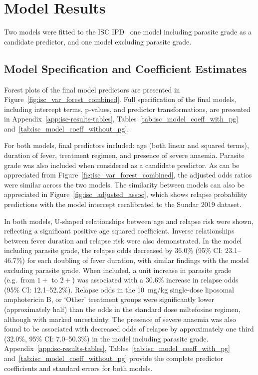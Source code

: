 \section{Model Results}

Two models were fitted to the ISC IPD \textemdash\ one model including parasite grade as a candidate predictor, and one model excluding parasite grade.

\subsection{Model Specification and Coefficient Estimates}

Forest plots of the final model predictors are presented in Figure~\ref{fig:isc_var_forest_combined}. Full specification of the final models, including intercept terms, p-values, and predictor transformations, are presented in Appendix~\ref{app:isc-results-tables}, Tables~\ref{tab:isc_model_coeff_with_pg} and~\ref{tab:isc_model_coeff_without_pg}.

For both models, final predictors included: age (both linear and squared terms), duration of fever, treatment regimen, and presence of severe anaemia. Parasite grade was also included when considered as a candidate predictor. As can be appreciated from Figure~\ref{fig:isc_var_forest_combined}, the adjusted odds ratios were similar across the two models. The similarity between models can also be appreciated in Figure~\ref{fig:isc_adjusted_assoc}, which shows relapse probability predictions with the model intercept recalibrated to the Sundar 2019 dataset\cite{sundar2019}.

In both models, U-shaped relationships between age and relapse risk were shown, reflecting a significant positive age squared coefficient. Inverse relationships between fever duration and relapse risk were also demonstrated. In the model including parasite grade, the relapse odds decreased by 36.0\% (95\% CI\@: 23.1--46.7\%) for each doubling of fever duration, with similar findings with the model excluding parasite grade. When included, a unit increase in parasite grade (e.g.\ from $1+$ to $2+$) was associated with a 30.6\% increase in relapse odds (95\% CI\@: 12.1--52.2\%). Relapse odds in the 10~mg/kg single-dose liposomal amphotericin B, or `Other' treatment groups were significantly lower (approximately half) than the odds in the standard dose miltefosine regimen, although with marked uncertainty. The presence of severe anaemia was also found to be associated with decreased odds of relapse by approximately one third (32.0\%, 95\% CI\@: 7.0--50.3\%) in the model including parasite grade. Appendix~\ref{app:isc-results-tables}, Tables~\ref{tab:isc_model_coeff_with_pg} and~\ref{tab:isc_model_coeff_without_pg} provide the complete predictor coefficients and standard errors for both models.

